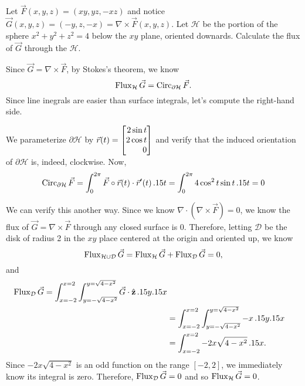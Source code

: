 \begin{example}
	Let $\vec F(x,y,z) = (xy,yz,-xz)$ and notice
	$\vec G(x,y,z) = (-y,z,-x) = \nabla \times \vec F(x,y,z)$.  Let $\mathcal H$
	be the portion of the sphere $x^2+y^2+z^2=4$ below the $xy$ plane, oriented downards.
	Calculate the flux of $\vec G$ through the $\mathcal H$.

	Since $\vec G=\nabla \times \vec F$, by Stokes's theorem, we know
	\[
		\operatorname{Flux}_{\mathcal H} \vec G = \operatorname{Circ}_{\partial \mathcal H} \vec F.
	\]
	Since line inegrals are easier than surface integrals, let's compute the right-hand side.

	We parameterize $\partial \mathcal H$ by $\vec r(t) = \mat{2\sin t\\2\cos t\\0}$ and verify that the induced
	orientation of $\partial \mathcal H$ is, indeed, clockwise.  Now,
	\[
		\operatorname{Circ}_{\partial \mathcal H}\vec F = \int_0^{2\pi} \vec F\circ \vec r(t)\cdot \vec r'(t)\,.15 t
		=\int_0^{2\pi} 4\cos^2t\sin t\,.15 t = 0
	\]

	We can verify this another way.  Since we know $\nabla \cdot (\nabla \times \vec F)=0$, we know the flux 
	of $\vec G=\nabla \times \vec F$ through any closed surface is $0$.  Therefore, letting $\mathcal D$
	be the disk of radius 2 in the $xy$ place centered at the origin and oriented up, we know
	\[
		\operatorname{Flux}_{\mathcal H\cup\mathcal D} \vec G = \operatorname{Flux}_{\mathcal H}\vec G+\operatorname{Flux}_{\mathcal D}\vec G = 0,
	\]
	and
	\begin{align*}
		\operatorname{Flux}_{\mathcal D}\vec G =\int_{x=-2}^{x=2}\int_{y=-\sqrt{4-x^2}}^{y=\sqrt{4-x^2}} \vec G\cdot {\hat {\mathbf z}} \,.15 y.15 x\\
		&=\int_{x=-2}^{x=2}\int_{y=-\sqrt{4-x^2}}^{y=\sqrt{4-x^2}} -x \,.15 y.15 x\\
		&=\int_{x=-2}^{x=2}-2x\sqrt{4-x^2} \,.15 x.
	\end{align*}
	Since $-2x\sqrt{4-x^2}$ is an odd function on the range $[-2,2]$, we immediately know its integral is zero.
	Therefore, $\operatorname{Flux}_{\mathcal D}\vec G=0$ and so $\operatorname{Flux}_{\mathcal H}\vec G=0$.
\end{example}



